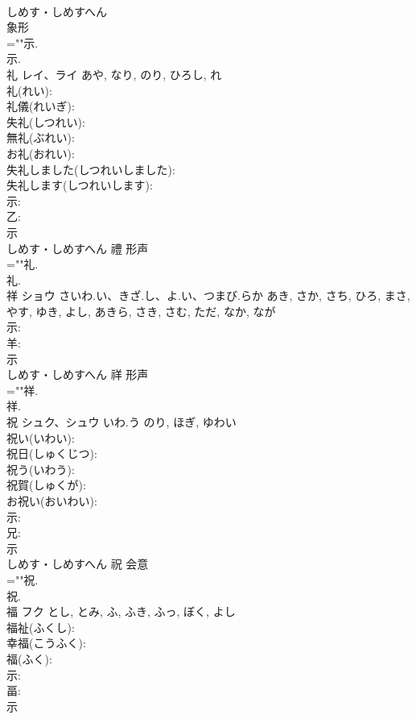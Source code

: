\documentclass[8pt]{extreport}
\begin{document}
\begin{CJK}{UTF8}{min}
\\	しめす・しめすへん	
\\	象形 
\\	=""示.
\\	示.
\\	礼	レイ、ライ		あや, なり, のり, ひろし, れ	
\\	礼(れい): 
\\	礼儀(れいぎ): 
\\	失礼(しつれい): 
\\	無礼(ぶれい): 
\\	お礼(おれい): 
\\	失礼しました(しつれいしました): 
\\	失礼します(しつれいします): 
\\	示: 
\\	乙: 
\\	示	
\\	しめす・しめすへん	禮	形声 
\\	=""礼.
\\	礼.
\\	祥	ショウ	さいわ.い、きざ.し、よ.い、つまび.らか	あき, さか, さち, ひろ, まさ, やす, ゆき, よし, あきら, さき, さむ, ただ, なか, なが	
\\	示: 
\\	羊: 
\\	示	
\\	しめす・しめすへん	祥	形声 
\\	=""祥.
\\	祥.
\\	祝	シュク、シュウ	いわ.う	のり, ほぎ, ゆわい	
\\	祝い(いわい): 
\\	祝日(しゅくじつ): 
\\	祝う(いわう): 
\\	祝賀(しゅくが): 
\\	お祝い(おいわい): 
\\	示: 
\\	兄: 
\\	示	
\\	しめす・しめすへん	祝	会意 
\\	=""祝.
\\	祝.
\\	福	フク		とし, とみ, ふ, ふき, ふっ, ぼく, よし	
\\	福祉(ふくし): 
\\	幸福(こうふく): 
\\	福(ふく): 
\\	示: 
\\	畐: 
\\	示	

\end{CJK}
\end{document}
